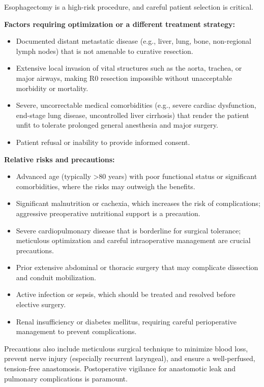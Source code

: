 Esophagectomy is a high-risk procedure, and careful patient selection is critical.

\textbf{Factors requiring optimization or a different treatment strategy:}
\begin{itemize}
  \item Documented distant metastatic disease (e.g., liver, lung, bone, non-regional lymph nodes) that is not amenable to curative resection.
  \item Extensive local invasion of vital structures such as the aorta, trachea, or major airways, making R0 resection impossible without unacceptable morbidity or mortality.
  \item Severe, uncorrectable medical comorbidities (e.g., severe cardiac dysfunction, end-stage lung disease, uncontrolled liver cirrhosis) that render the patient unfit to tolerate prolonged general anesthesia and major surgery.
  \item Patient refusal or inability to provide informed consent.
\end{itemize}

\textbf{Relative risks and precautions:}
\begin{itemize}
  \item Advanced age (typically >80 years) with poor functional status or significant comorbidities, where the risks may outweigh the benefits.
  \item Significant malnutrition or cachexia, which increases the risk of complications; aggressive preoperative nutritional support is a precaution.
  \item Severe cardiopulmonary disease that is borderline for surgical tolerance; meticulous optimization and careful intraoperative management are crucial precautions.
  \item Prior extensive abdominal or thoracic surgery that may complicate dissection and conduit mobilization.
  \item Active infection or sepsis, which should be treated and resolved before elective surgery.
  \item Renal insufficiency or diabetes mellitus, requiring careful perioperative management to prevent complications.
\end{itemize}

Precautions also include meticulous surgical technique to minimize blood loss, prevent nerve injury (especially recurrent laryngeal), and ensure a well-perfused, tension-free anastomosis. Postoperative vigilance for anastomotic leak and pulmonary complications is paramount.

